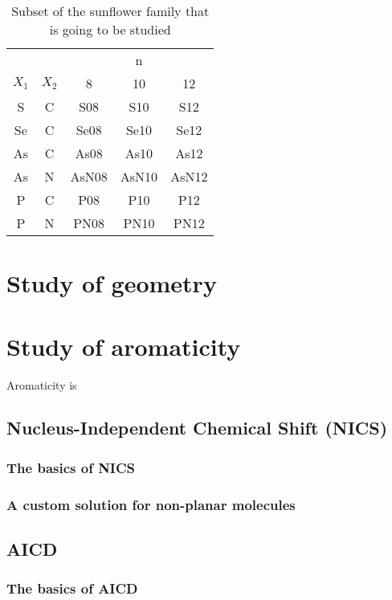 \begin{table}
    \centering
    \caption[Sunflowers in this study]{Subset of the sunflower family that is going to be studied}
    \begin{tabular}{@{}ccccc@{}}
        \toprule
        && \multicolumn{3}{c}{n} \\
        $X_1$ & $X_2$ & 8 & 10 & 12 \\
        \midrule
        S & C & S08 & S10 & S12 \\
        Se & C & Se08 & Se10 & Se12 \\
        As & C & As08 & As10 & As12 \\
        As & N & AsN08 & AsN10 & AsN12 \\
        P & C & P08 & P10 & P12 \\
        P & N & PN08 & PN10 & PN12 \\
        \bottomrule
    \end{tabular}
\end{table}

\section{Study of geometry}

\blindtext


\section{Study of aromaticity}

Aromaticity is

\subsection{Nucleus-Independent Chemical Shift (NICS)}
\blindtext
\subsubsection{The basics of NICS}
\blindtext
\subsubsection{A custom solution for non-planar molecules}
\blindtext

\subsection{AICD}
\subsubsection{The basics of AICD}
\blindtext
